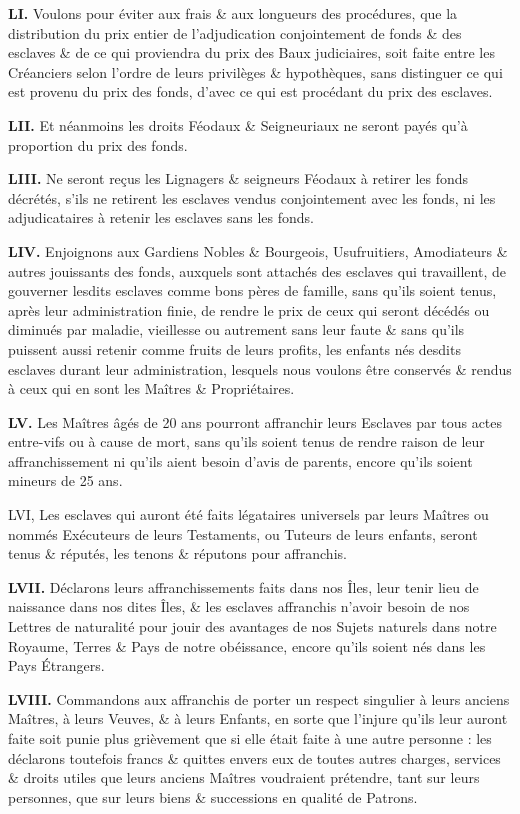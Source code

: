 \documentclass[french,twoside]{book} %
\newcommand{\labelchar}[1]{{\color{rubric}\bf #1}}
\begin{document}
\labelchar{LI.} Voulons pour éviter aux frais \& aux longueurs des procédures, que la distribution du prix entier de l’adjudication conjointement de fonds \& des esclaves \& de ce qui proviendra du prix des Baux judiciaires, soit faite entre les Créanciers selon l’ordre de leurs privilèges \& hypothèques, sans distinguer ce qui est provenu du prix des fonds, d’avec ce qui est procédant du prix des esclaves.\par
\labelchar{LII.} Et néanmoins les droits Féodaux \& Seigneuriaux ne seront payés qu’à proportion du prix des fonds.\par
\labelchar{LIII.} Ne seront reçus les Lignagers \& seigneurs Féodaux à retirer les fonds décrétés, s’ils ne retirent les esclaves vendus conjointement avec les fonds, ni les adjudicataires à retenir les esclaves sans les fonds.\par
\labelchar{LIV.} Enjoignons aux Gardiens Nobles \& Bourgeois, Usufruitiers, Amodiateurs \& autres jouissants des fonds, auxquels sont attachés des esclaves qui travaillent, de gouverner lesdits esclaves comme bons pères de famille, sans qu’ils soient tenus, après leur administration finie, de rendre le prix de ceux qui seront décédés ou diminués par maladie, vieillesse ou autrement sans leur faute \& sans qu’ils puissent aussi retenir comme fruits de leurs profits, les enfants nés desdits esclaves durant leur administration, lesquels nous voulons être conservés \& rendus à ceux qui en sont les Maîtres \& Propriétaires.\par
\labelchar{LV.} Les Maîtres âgés de 20 ans pourront affranchir leurs Esclaves par tous actes entre-vifs ou à cause de mort, sans qu’ils soient tenus de rendre raison de leur affranchissement ni qu’ils aient besoin d’avis de parents, encore qu’ils soient mineurs de 25 ans.\par
LVI, Les esclaves qui auront été faits légataires universels par leurs Maîtres ou nommés Exécuteurs de leurs Testaments, ou Tuteurs de leurs enfants, seront tenus \& réputés, les tenons \& réputons pour affranchis.\par
\labelchar{LVII.} Déclarons leurs affranchissements faits dans nos Îles, leur tenir lieu de naissance dans nos dites Îles, \& les esclaves affranchis n’avoir besoin de nos Lettres de naturalité pour jouir des avantages de nos Sujets naturels dans notre Royaume, Terres \& Pays de notre obéissance, encore qu’ils soient nés dans les Pays Étrangers.\par
\labelchar{LVIII.} Commandons aux affranchis de porter un respect singulier à leurs anciens Maîtres, à leurs Veuves, \& à leurs Enfants, en sorte que l’injure qu’ils leur auront faite soit punie plus grièvement que si elle était faite à une autre personne : les déclarons toutefois francs \& quittes envers eux de toutes autres charges, services \& droits utiles que leurs anciens Maîtres voudraient prétendre, tant sur leurs personnes, que sur leurs biens \& successions en qualité de Patrons.\par
\end{document}
